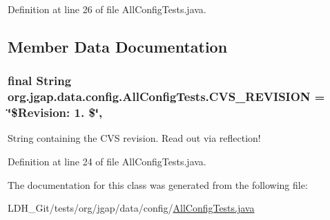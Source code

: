 Definition at line 26 of file All\-Config\-Tests.\-java.



\subsection{Member Data Documentation}
\hypertarget{classorg_1_1jgap_1_1data_1_1config_1_1_all_config_tests_ac8513abe695046e34b415153b4b8a2f2}{
\subsubsection[{C\-V\-S\-\_\-\-R\-E\-V\-I\-S\-I\-O\-N}]{\setlength{\rightskip}{0pt plus 5cm}final String org.\-jgap.\-data.\-config.\-All\-Config\-Tests.\-C\-V\-S\-\_\-\-R\-E\-V\-I\-S\-I\-O\-N = \char`\"{}\$Revision\-: 1. \$\char`\"{}\hspace{0.3cm}{\ttfamily [static]}, {\ttfamily [private]}}}\label{classorg_1_1jgap_1_1data_1_1config_1_1_all_config_tests_ac8513abe695046e34b415153b4b8a2f2}
String containing the C\-V\-S revision. Read out via reflection! 

Definition at line 24 of file All\-Config\-Tests.\-java.



The documentation for this class was generated from the following file\-:\begin{DoxyCompactItemize}
\item 
L\-D\-H\-\_\-\-Git/tests/org/jgap/data/config/\hyperlink{_all_config_tests_8java}{All\-Config\-Tests.\-java}\end{DoxyCompactItemize}
